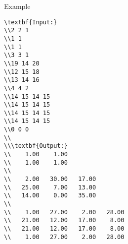Example
\begin{verbatim}
\textbf{Input:}
\\2 2 1
\\1 1
\\1 1
\\3 3 1
\\19 14 20
\\12 15 18
\\13 14 16
\\4 4 2
\\14 15 14 15
\\14 15 14 15
\\14 15 14 15
\\14 15 14 15
\\0 0 0
\\
\\\textbf{Output:}
\\    1.00    1.00 
\\    1.00    1.00
\\
\\    2.00   30.00   17.00
\\   25.00    7.00   13.00
\\   14.00    0.00   35.00
\\
\\    1.00   27.00    2.00   28.00
\\   21.00   12.00   17.00    8.00
\\   21.00   12.00   17.00    8.00
\\    1.00   27.00    2.00   28.00\end{verbatim}